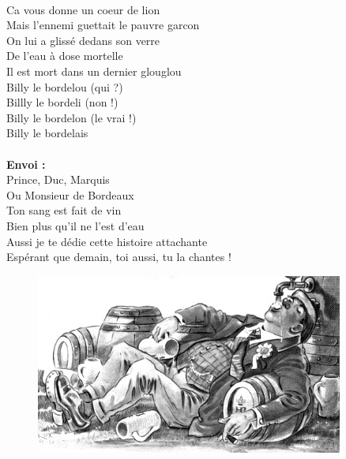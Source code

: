 \\Ca vous donne un coeur de lion
\\Mais l'ennemi guettait le pauvre garcon
\\On lui a glissé dedans son verre
\\De l'eau à dose mortelle
\\Il est mort dans un dernier glouglou
\\Billy le bordelou (qui ?)
\\Billly le bordeli (non !)
\\Billy le bordelon (le vrai !)
\\Billy le bordelais
\\\\\textbf{Envoi : }
\\Prince, Duc, Marquis
\\Ou Monsieur de Bordeaux
\\Ton sang est fait de vin
\\Bien plus qu'il ne l'est d'eau
\\Aussi je te dédie cette histoire attachante
\\Espérant que demain, toi aussi, tu la chantes !

\vspace{1cm}
\begin{figure}[h!]
\centering
   \includegraphics[width=0.9\textwidth]{images/bourguignone.jpg}
 \end{figure}

\breakpage